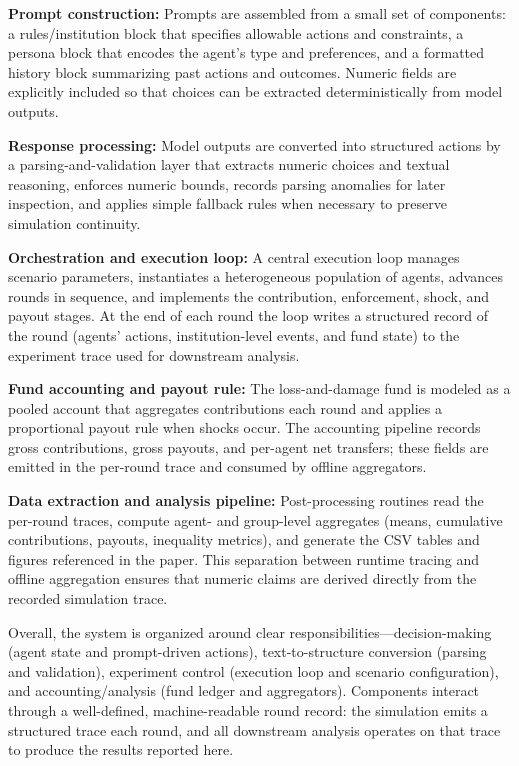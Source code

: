 \documentclass[12pt,letterpaper]{article}
\begin{document}
\textbf{Prompt construction:} Prompts are assembled from a small set of components: a rules/institution block that specifies allowable actions and constraints, a persona block that encodes the agent's type and preferences, and a formatted history block summarizing past actions and outcomes. Numeric fields are explicitly included so that choices can be extracted deterministically from model outputs.

\textbf{Response processing:} Model outputs are converted into structured actions by a parsing-and-validation layer that extracts numeric choices and textual reasoning, enforces numeric bounds, records parsing anomalies for later inspection, and applies simple fallback rules when necessary to preserve simulation continuity.

\textbf{Orchestration and execution loop:} A central execution loop manages scenario parameters, instantiates a heterogeneous population of agents, advances rounds in sequence, and implements the contribution, enforcement, shock, and payout stages. At the end of each round the loop writes a structured record of the round (agents' actions, institution-level events, and fund state) to the experiment trace used for downstream analysis.

\textbf{Fund accounting and payout rule:} The loss-and-damage fund is modeled as a pooled account that aggregates contributions each round and applies a proportional payout rule when shocks occur. The accounting pipeline records gross contributions, gross payouts, and per-agent net transfers; these fields are emitted in the per-round trace and consumed by offline aggregators.

\textbf{Data extraction and analysis pipeline:} Post-processing routines read the per-round traces, compute agent- and group-level aggregates (means, cumulative contributions, payouts, inequality metrics), and generate the CSV tables and figures referenced in the paper. This separation between runtime tracing and offline aggregation ensures that numeric claims are derived directly from the recorded simulation trace.

Overall, the system is organized around clear responsibilities—decision-making (agent state and prompt-driven actions), text-to-structure conversion (parsing and validation), experiment control (execution loop and scenario configuration), and accounting/analysis (fund ledger and aggregators). Components interact through a well-defined, machine-readable round record: the simulation emits a structured trace each round, and all downstream analysis operates on that trace to produce the results reported here.
\end{document}
